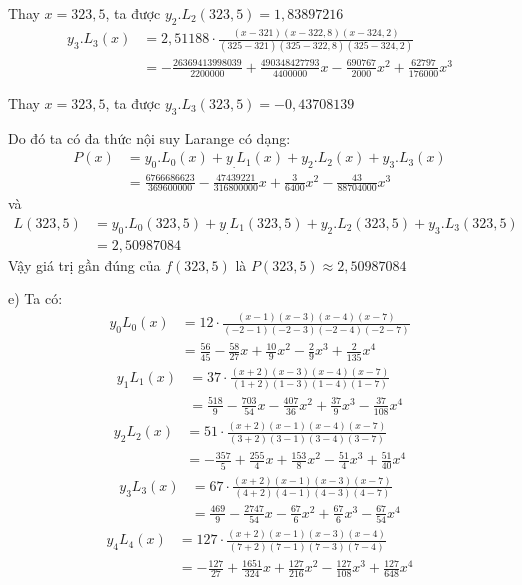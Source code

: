 Thay $x=323,5$, ta được $y_2.L_2(323,5)=1,83897216$
\begin{align*}
	y_3.L_3(x)	& =2,51188\cdot\frac{(x-321)(x-322,8)(x-324,2)}{(325-321)(325-322,8)(325-324,2)}\\
				& =-\frac{26369413998039}{2200000}+\frac{490348427793}{4400000}x-\frac{690767}{2000}x^2+\frac{62797}{176000}x^3
\end{align*}

Thay $x=323,5$, ta được $y_3.L_3(323,5)=-0,43708139$\par
Do đó ta có đa thức nội suy Larange có dạng: \begin{align*}
	P(x) & =y_0.L_0(x)+y_.L_1(x)+y_2.L_2(x)+y_3.L_3(x)\\
	     & =\frac{6766686623}{369600000}-\frac{47439221}{316800000}x+\frac{3}{6400}x^2-\frac{43}{88704000}x^3
\end{align*}
và \begin{align*}
	L(323,5) &=y_0.L_0(323,5)+y_.L_1(323,5)+y_2.L_2(323,5)+y_3.L_3(323,5)\\
	         &=2,50987084
\end{align*}
Vậy giá trị gần đúng của $f(323,5)$ là $P(323,5)\approx 2,50987084$\par

e) Ta có:
\begin{align*}
	y_0L_0(x)	& =12\cdot\frac{(x-1)(x-3)(x-4)(x-7)}{(-2-1)(-2-3)(-2-4)(-2-7)}\\
				& =\frac{56}{45}-\frac{58}{27}x+\frac{10}{9}x^2-\frac{2}{9}x^3+\frac{2}{135}x^4
\end{align*}
\begin{align*}
	y_1L_1(x)	& =37\cdot\frac{(x+2)(x-3)(x-4)(x-7)}{(1+2)(1-3)(1-4)(1-7)}\\
				& =\frac{518}{9}-\frac{703}{54}x-\frac{407}{36}x^2+\frac{37}{9}x^3-\frac{37}{108}x^4
\end{align*}
\begin{align*}
	y_2L_2(x)	& =51\cdot\frac{(x+2)(x-1)(x-4)(x-7)}{(3+2)(3-1)(3-4)(3-7)}\\
				& =-\frac{357}{5}+\frac{255}{4}x+\frac{153}{8}x^2-\frac{51}{4}x^3+\frac{51}{40}x^4
\end{align*}
\begin{align*}
	y_3L_3(x)	&=67\cdot\frac{(x+2)(x-1)(x-3)(x-7)}{(4+2)(4-1)(4-3)(4-7)}\\
				&=\frac{469}{9}-\frac{2747}{54}x-\frac{67}{6}x^2+\frac{67}{6}x^3-\frac{67}{54}x^4
\end{align*}
\begin{align*}
	y_4L_4(x)	& =127\cdot\frac{(x+2)(x-1)(x-3)(x-4)}{(7+2)(7-1)(7-3)(7-4)}\\
				& =-\frac{127}{27}+\frac{1651}{324}x+\frac{127}{216}x^2-\frac{127}{108}x^3+\frac{127}{648}x^4
\end{align*}

